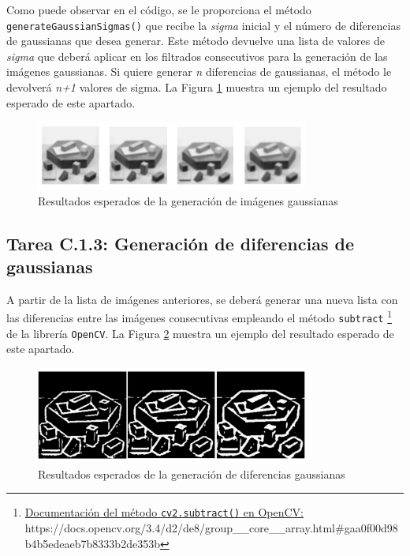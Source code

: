 Como puede observar en el código, se le proporciona el método \texttt{generateGaussianSigmas()} que recibe la \textit{sigma} inicial y el número de diferencias de gaussianas que desea generar. Este método devuelve una lista de valores de \textit{sigma} que deberá aplicar en los filtrados consecutivos para la generación de las imágenes gaussianas. Si quiere generar \textit{n} diferencias de gaussianas, el método le devolverá \textit{n+1} valores de sigma. La Figura \ref{fig:gauss_blur} muestra un ejemplo del resultado esperado de este apartado.

\begin{figure}[h]
    \centering
    \includegraphics[width=0.8\textwidth]{Lab_3/template/figures/GaussianBlur.png}
    \caption{Resultados esperados de la generación de imágenes gaussianas}
    \label{fig:gauss_blur}
\end{figure}

\subsection*{Tarea C.1.3: Generación de diferencias de gaussianas}

A partir de la lista de imágenes anteriores, se deberá generar una nueva lista con las diferencias entre las imágenes consecutivas empleando el método \texttt{subtract} \footnote{ \href{https://docs.opencv.org/3.4/d2/de8/group\_\_core\_\_array.html\#gaa0f00d98b4b5edeaeb7b8333b2de353b}{Documentación del método \texttt{cv2.subtract()} en OpenCV:} \\{https://docs.opencv.org/3.4/d2/de8/group\_\_core\_\_array.html\#gaa0f00d98b4b5edeaeb7b8333b2de353b}} de la librería \texttt{OpenCV}. La Figura \ref{fig:dog} muestra un ejemplo del resultado esperado de este apartado.

\begin{figure}[h]
    \centering
    \includegraphics[width=0.8\textwidth]{Lab_3/template/figures/DoG.png}
    \caption{Resultados esperados de la generación de diferencias gaussianas}
    \label{fig:dog}
\end{figure}


